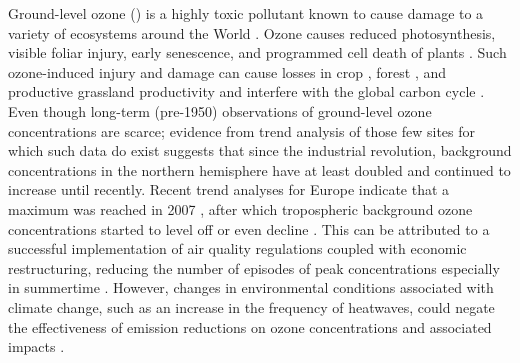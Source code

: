 \documentclass[bg, manuscript]{copernicus}
\begin{document}

\introduction  %
\label{sec:intro}

Ground-level ozone () is a highly toxic pollutant known to cause damage to a variety of ecosystems around the World \citep{PT:Emberson2020}. Ozone causes reduced photosynthesis, visible foliar injury, early senescence, and programmed cell death of plants \citep{PCE:Kangasjarvi2005}. Such ozone-induced injury and damage can cause losses in crop \citep{PJ:Ainsworth2017}, forest \citep{GCB:Wittig2009,EP:Matyssek2012}, and productive grassland productivity and interfere with the global carbon cycle \citep{BGS:Lombardozzi2013}. Even though long-term (pre-1950) observations of ground-level ozone concentrations are scarce; evidence from trend analysis of those few sites for which such data do exist suggests that since the industrial revolution, background concentrations in the northern hemisphere have at least doubled and continued to increase \citep{IPCC2013} until recently. Recent trend analyses for Europe indicate that a maximum was reached in 2007 \citep{AE:Derwent2018}, after which tropospheric background ozone concentrations started to level off or even decline \citep{ESA:Cooper2014, ACP:Wespes2018,ESA:Gaudel2018}. This can be attributed to a successful implementation of air quality regulations coupled with economic restructuring, reducing the number of episodes of peak concentrations especially in summertime \citep[e.g.,][]{ESA:Fleming2018, ESA:Mills2018}. However, changes in environmental conditions associated with climate change, such as an increase in the frequency of heatwaves, could negate the effectiveness of emission reductions on ozone concentrations and associated impacts \citep{NCC:Lin2020}. 
\end{document}
